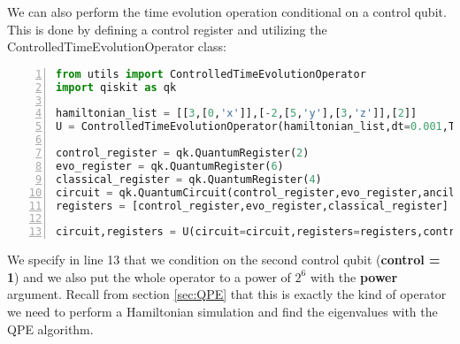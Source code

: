 We can also perform the time evolution operation conditional on a control qubit. This is done by defining a control register and utilizing the ControlledTimeEvolutionOperator class:
\begin{lstlisting}[language=Python,numbers=left]
from utils import ControlledTimeEvolutionOperator
import qiskit as qk 

hamiltonian_list = [[3,[0,'x']],[-2,[5,'y'],[3,'z']],[2]]
U = ControlledTimeEvolutionOperator(hamiltonian_list,dt=0.001,T=1)

control_register = qk.QuantumRegister(2)
evo_register = qk.QuantumRegister(6)
classical_register = qk.QuantumRegister(4)
circuit = qk.QuantumCircuit(control_register,evo_register,ancilla_register,classical_register)
registers = [control_register,evo_register,classical_register]

circuit,registers = U(circuit=circuit,registers=registers,control=1,power=2**6)
\end{lstlisting}
We specify in line 13 that we condition on the second control qubit (\textbf{control = 1}) and we also put the whole operator to a power of $2^6$ with the \textbf{power} argument. Recall from section \ref{sec:QPE} that this is exactly the kind of operator we need to perform a Hamiltonian simulation and find the eigenvalues with the QPE algorithm.


